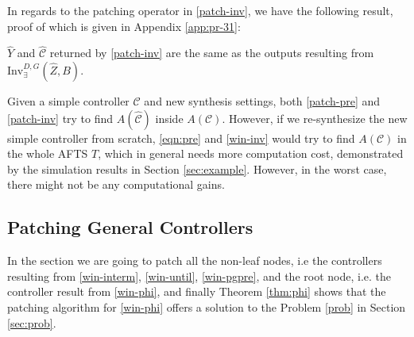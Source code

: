 In regards to the patching operator in \eqref{patch-inv}, we have the following result, proof of which is given in Appendix \ref{app:pr-31}:

\begin{theorem}
	$ \widehat{Y} $ and $ \widehat{\mathcal{C}} $ returned by \eqref{patch-inv} are the same as the outputs resulting from $ \text{Inv}_{\exists}^{D,G}(\widehat{Z},B) $.	\label{thm:inv}
\end{theorem}
Given a simple controller $ \mathcal{C} $ and new synthesis settings, both \eqref{patch-pre} and \eqref{patch-inv} try to find $ A(\widehat{\mathcal{C}}) $ inside $ A(\mathcal{C}) $. However, if we re-synthesize the new simple controller from scratch, \eqref{eqn:pre} and \eqref{win-inv} would try to find $ A(\mathcal{C}) $ in the whole AFTS $ T $, which in general needs more computation cost, demonstrated by the simulation results in Section \ref{sec:example}. However, in the worst case, there might not be any computational gains.

\subsection{Patching General Controllers}
\label{sec:patch-cont}

In the section we are going to patch all the non-leaf nodes, i.e  the controllers resulting from \eqref{win-interm}, \eqref{win-until}, \eqref{win-pgpre}, and the root node, i.e. the controller result from \eqref{win-phi}, and finally Theorem \ref{thm:phi} shows that the patching algorithm for \eqref{win-phi} offers a solution to the Problem \ref{prob} in Section \ref{sec:prob}.



